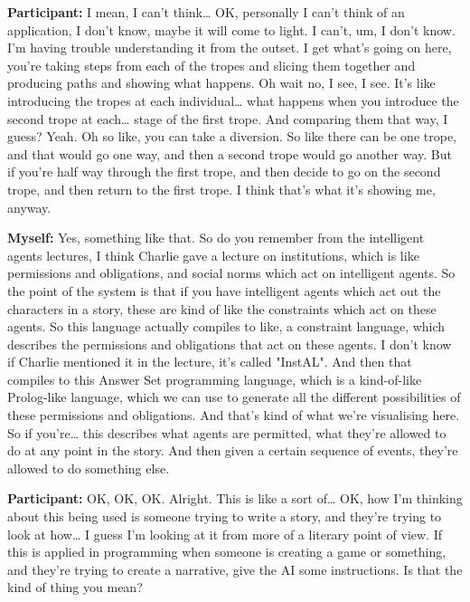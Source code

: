 \documentclass[11pt]{report}
\begin{document}
\begin{linenumbers}
\textbf{Participant:} I mean, I can't think\ldots{} OK, personally I can't think of an application, I don't know, maybe it will come to light. I can't, um, I don't know. I'm having trouble understanding it from the outset. I get what's going on here, you're taking steps from each of the tropes and slicing them together and producing paths and showing what happens. Oh wait no, I see, I see. It's like introducing the tropes at each individual\ldots{} what happens when you introduce the second trope at each\ldots{} stage of the first trope. And comparing them that way, I guess? Yeah. Oh so like, you can take a diversion. So like there can be one trope, and that would go one way, and then a second trope would go another way. But if you're half way through the first trope, and then decide to go on the second trope, and then return to the first trope. I think that's what it's showing me, anyway.

\textbf{Myself:} Yes, something like that. So do you remember from the intelligent agents lectures, I think Charlie gave a lecture on institutions, which is like permissions and obligations, and social norms which act on intelligent agents. So the point of the system is that if you have intelligent agents which act out the characters in a story, these are kind of like the constraints which act on these agents. So this language actually compiles to like, a constraint language, which describes the permissions and obligations that act on these agents. I don't know if Charlie mentioned it in the lecture, it's called "InstAL". And then that compiles to this Answer Set programming language, which is a kind-of-like Prolog-like language, which we can use to generate all the different possibilities of these permissions and obligations. And that's kind of what we're visualising here. So if you're\ldots{} this describes what agents are permitted, what they're allowed to do at any point in the story. And then given a certain sequence of events, they're allowed to do something else.

\textbf{Participant:} OK, OK, OK. Alright. This is like a sort of\ldots{} OK, how I'm thinking about this being used is someone trying to write a story, and they're trying to look at how\ldots{} I guess I'm looking at it from more of a literary point of view. If this is applied in programming when someone is creating a game or something, and they're trying to create a narrative, give the AI some instructions. Is that the kind of thing you mean?


\end{linenumbers}
\end{document}
